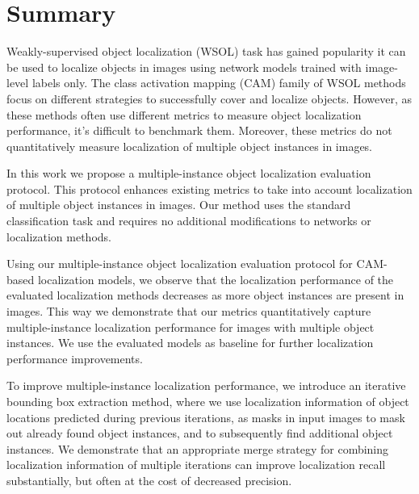 \chapter*{Summary}

Weakly-supervised object localization (WSOL) task has gained popularity it can be used to localize objects in images using network models trained with image-level labels only. The class activation mapping (CAM) family of WSOL methods focus on different strategies to successfully cover and localize objects. However, as these methods often use different metrics to measure object localization performance, it's difficult to benchmark them. Moreover, these metrics do not quantitatively measure localization of multiple object instances in images.

In this work we propose a multiple-instance object localization evaluation protocol. This protocol enhances existing metrics to take into account localization of multiple object instances in images. Our method uses the standard classification task and requires no additional modifications to networks or localization methods.

Using our multiple-instance object localization evaluation protocol for CAM-based localization models, we observe that the localization performance of the evaluated localization methods decreases as more object instances are present in images. This way we demonstrate that our metrics quantitatively capture multiple-instance localization performance for images with multiple object instances. We use the evaluated models as baseline for further localization performance improvements.

To improve multiple-instance localization performance, we introduce an iterative bounding box extraction method, where we use localization information of object locations predicted during previous iterations, as masks in input images to mask out already found object instances, and to subsequently find additional object instances. We demonstrate that an appropriate merge strategy for combining localization information of multiple iterations can improve localization recall substantially, but often at the cost of decreased precision.